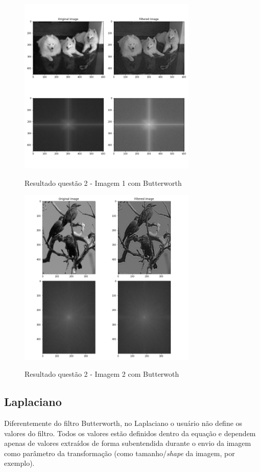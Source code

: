 \documentclass{article}
\begin{document}
\begin{figure}[H]
	\label{fig: q2_1_butter}
	\begin{minipage}[b]{1.0\linewidth}
		\centering
		\centerline{\includegraphics[width=8.5cm]{Figures/result2_1_butter}}
		\centerline{Resultado questão 2 - Imagem 1 com Butterworth}\medskip	
	\end{minipage}
\end{figure}

\begin{figure}[H]
	\label{fig: q2_2_butter}
	\begin{minipage}[b]{1.0\linewidth}
		\centering
		\centerline{\includegraphics[width=8.5cm]{Figures/result2_2_butter}}
		\centerline{Resultado questão 2 - Imagem 2 com Butterwoth}\medskip	
	\end{minipage}
\end{figure}

\subsection{Laplaciano}
Diferentemente do filtro Butterworth, no Laplaciano o usuário não define os valores do filtro. Todos os valores estão definidos dentro da equação e dependem apenas de valores extraídos de forma subentendida durante o envio da imagem como parâmetro da transformação (como tamanho/\textit{shape} da imagem, por exemplo).
\end{document}

